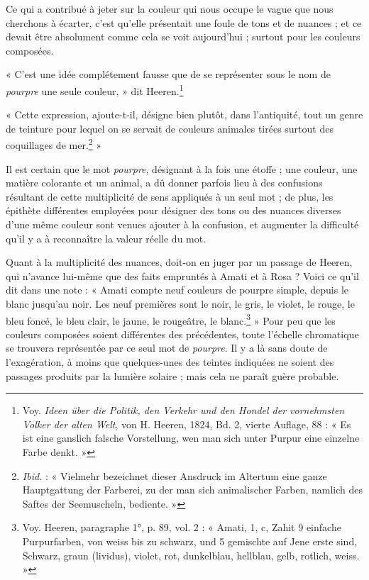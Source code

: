 \documentclass[a4paper, 11pt, oneside, polutonikogreek, french]{article}
\begin{document}
Ce qui a contribué à jeter sur la couleur qui nous occupe le vague que nous cherchons à écarter, c'est qu'elle présentait une foule de tons et de nuances ; et ce devait être absolument comme cela se voit aujourd'hui ; surtout pour les couleurs composées.

« C'est une idée complétement fausse que de se représenter sous le nom de \emph{pourpre} une seule couleur, » dit Heeren.\footnote{Voy. \emph{Ideen über die Politik, den Verkehr und den Hondel der vornehmsten Volker der alten Welt}, von H. Heeren, 1824, Bd. 2, vierte Auflage, 88 : « Es ist eine ganslich falsche Vorstellung, wen man sich unter Purpur eine einzelne Farbe denkt. »}

« Cette expression, ajoute-t-il, désigne bien plutôt, dans l'antiquité, tout un genre de teinture pour lequel on se servait de couleurs animales tirées surtout des coquillages de mer.\footnote{\emph{Ibid.} : « Vielmehr bezeichnet dieser Ansdruck im Altertum eine ganze Hauptgattung der Farberei, zu der man sich animalischer Farben, namlich des Saftes der Seemuscheln, bediente. »} »

Il est certain que le mot \emph{pourpre}, désignant à la fois une étoffe ; une couleur, une matière colorante et un animal, a dû donner parfois lieu à des confusions résultant de cette multiplicité de sens appliqués à un seul mot ; de plus, les épithète différentes employées pour désigner des tons ou des nuances diverses d'une même couleur sont venues ajouter à la confusion, et augmenter la difficulté qu'il y a à reconnaître la valeur réelle du mot.

Quant à la multiplicité des nuances, doit-on en juger par un passage de Heeren, qui n'avance lui-même que des faits empruntés à Amati et à Rosa ? Voici ce qu'il dit dans une note : « Amati compte neuf couleurs de pourpre simple, depuis le blanc jusqu'au noir. Les neuf premières sont le noir, le gris, le violet, le rouge, le bleu foncé, le bleu clair, le jaune, le rougeâtre, le blanc.\footnote{Voy. Heeren, paragraphe 1°, p. 89, vol. 2 : « Amati, 1, c, Zahit 9 einfache Purpurfarben, von weiss bis zu schwarz, und 5 gemischte auf Jene erste sind, Schwarz, graun (lividus), violet, rot, dunkelblau, hellblau, gelb, rotlich, weiss. »} » Pour peu que les couleurs composées soient différentes des précédentes, toute l'échelle chromatique se trouvera représentée par ce seul mot de \emph{pourpre}. Il y a là sans doute de l'exagération, à moins que quelques-unes des teintes indiquées ne soient des passages produits par la lumière solaire ; mais cela ne paraît guère probable.
\end{document}
